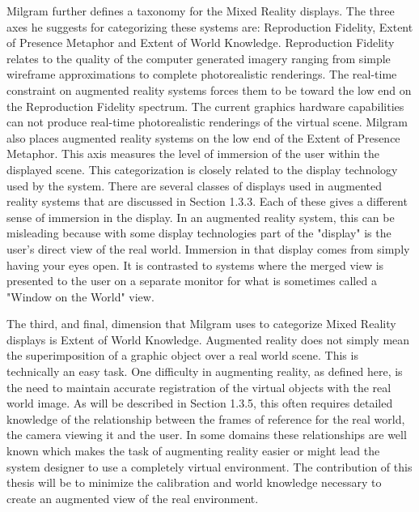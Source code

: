 Milgram further defines a taxonomy for the Mixed Reality displays. The three axes he suggests for categorizing these systems are: Reproduction Fidelity, Extent of Presence Metaphor and Extent of World Knowledge. Reproduction Fidelity relates to the quality of the computer generated imagery ranging from simple wireframe approximations to complete photorealistic renderings. The real-time constraint on augmented reality systems forces them to be toward the low end on the Reproduction Fidelity spectrum. The current graphics hardware capabilities can not produce real-time photorealistic renderings of the virtual scene. Milgram also places augmented reality systems on the low end of the Extent of Presence Metaphor. This axis measures the level of immersion of the user within the displayed scene. This categorization is closely related to the display technology used by the system. There are several classes of displays used in augmented reality systems that are discussed in Section 1.3.3. Each of these gives a different sense of immersion in the display. In an augmented reality system, this can be misleading because with some display technologies part of the "display" is the user's direct view of the real world. Immersion in that display comes from simply having your eyes open. It is contrasted to systems where the merged view is presented to the user on a separate monitor for what is sometimes called a "Window on the World" view.

The third, and final, dimension that Milgram uses to categorize Mixed Reality displays is Extent of World Knowledge. Augmented reality does not simply mean the superimposition of a graphic object over a real world scene. This is technically an easy task. One difficulty in augmenting reality, as defined here, is the need to maintain accurate registration of the virtual objects with the real world image. As will be described in Section 1.3.5, this often requires detailed knowledge of the relationship between the frames of reference for the real world, the camera viewing it and the user. In some domains these relationships are well known which makes the task of augmenting reality easier or might lead the system designer to use a completely virtual environment. The contribution of this thesis will be to minimize the calibration and world knowledge necessary to create an augmented view of the real environment.